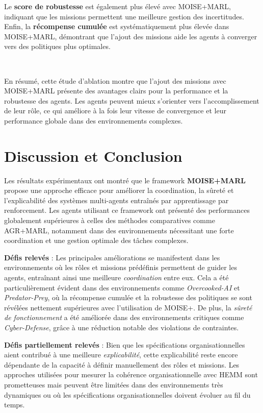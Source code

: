 \documentclass[sigconf,anonymous]{aamas}
\begin{document}
Le \textbf{score de robustesse} est également plus élevé avec MOISE+MARL, indiquant que les missions permettent une meilleure gestion des incertitudes. Enfin, la \textbf{récompense cumulée} est systématiquement plus élevée dans MOISE+MARL, démontrant que l'ajout des missions aide les agents à converger vers des politiques plus optimales.

\

En résumé, cette étude d'ablation montre que l'ajout des missions avec MOISE+MARL présente des avantages clairs pour la performance et la robustesse des agents. Les agents peuvent mieux s'orienter vers l'accomplissement de leur rôle, ce qui améliore à la fois leur vitesse de convergence et leur performance globale dans des environnements complexes.


\section{Discussion et Conclusion}
\label{sec:discussion_conclusion}


Les résultats expérimentaux ont montré que le framework \textbf{MOISE+MARL} propose une approche efficace pour améliorer la coordination, la sûreté et l'explicabilité des systèmes multi-agents entraînés par apprentissage par renforcement. Les agents utilisant ce framework ont présenté des performances globalement supérieures à celles des méthodes comparatives comme AGR+MARL, notamment dans des environnements nécessitant une forte coordination et une gestion optimale des tâches complexes.

\textbf{Défis relevés} : Les principales améliorations se manifestent dans les environnements où les rôles et missions prédéfinis permettent de guider les agents, entraînant ainsi une meilleure \textit{coordination} entre eux. Cela a été particulièrement évident dans des environnements comme \textit{Overcooked-AI} et \textit{Predator-Prey}, où la récompense cumulée et la robustesse des politiques se sont révélées nettement supérieures avec l'utilisation de MOISE+. De plus, la \textit{sûreté de fonctionnement} a été améliorée dans des environnements critiques comme \textit{Cyber-Defense}, grâce à une réduction notable des violations de contraintes.

\textbf{Défis partiellement relevés} : Bien que les spécifications organisationnelles aient contribué à une meilleure \textit{explicabilité}, cette explicabilité reste encore dépendante de la capacité à définir manuellement des rôles et missions. Les approches utilisées pour mesurer la cohérence organisationnelle avec HEMM sont prometteuses mais peuvent être limitées dans des environnements très dynamiques ou où les spécifications organisationnelles doivent évoluer au fil du temps.
\end{document}
